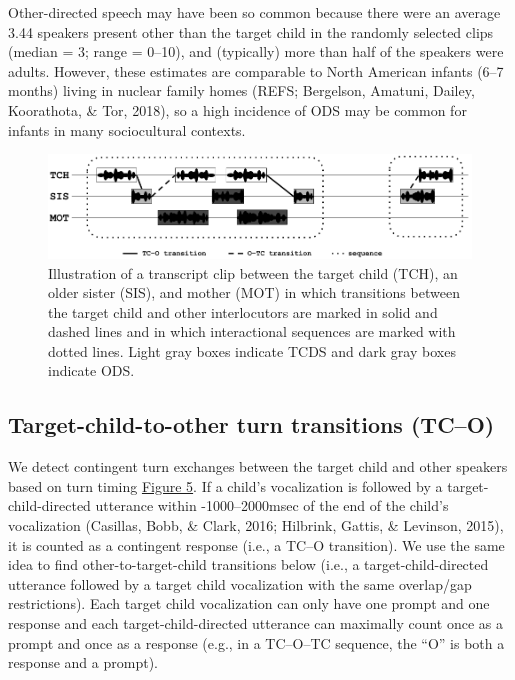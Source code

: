 \documentclass[floatsintext,man]{apa6}
\theoremstyle{definition}
\theoremstyle{definition}
\theoremstyle{definition}
\theoremstyle{remark}
\begin{document}
Other-directed speech may have been so common because there were an
average 3.44 speakers present other than the target child in the
randomly selected clips (median = 3; range = 0--10), and (typically)
more than half of the speakers were adults. However, these estimates are
comparable to North American infants (6--7 months) living in nuclear
family homes (REFS; Bergelson, Amatuni, Dailey, Koorathota, \& Tor,
2018), so a high incidence of ODS may be common for infants in many
sociocultural contexts.

\begin{figure}
\includegraphics[width=1\linewidth]{Tseltal-CLE_files/TseltalCLE-TurnTimingIllustration} \caption{Illustration of a transcript clip between the target child (TCH), an older sister (SIS), and mother (MOT) in which transitions between the target child and other interlocutors are marked in solid and dashed lines and in which interactional sequences are marked with dotted lines. Light gray boxes indicate TCDS and dark gray boxes indicate ODS.}\label{fig:fig5}
\end{figure}

\subsection{Target-child-to-other turn transitions
(TC--O)}\label{target-child-to-other-turn-transitions-tco}

We detect contingent turn exchanges between the target child and other
speakers based on turn timing \protect\hyperlink{fig5}{Figure 5}. If a
child's vocalization is followed by a target-child-directed utterance
within -1000--2000msec of the end of the child's vocalization (Casillas,
Bobb, \& Clark, 2016; Hilbrink, Gattis, \& Levinson, 2015), it is
counted as a contingent response (i.e., a TC--O transition). We use the
same idea to find other-to-target-child transitions below (i.e., a
target-child-directed utterance followed by a target child vocalization
with the same overlap/gap restrictions). Each target child vocalization
can only have one prompt and one response and each target-child-directed
utterance can maximally count once as a prompt and once as a response
(e.g., in a TC--O--TC sequence, the \enquote{O} is both a response and a
prompt).
\end{document}
